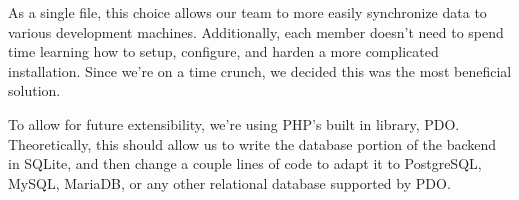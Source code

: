 \documentclass[journal]{IEEEtran}
\begin{document}
As a single file, this choice allows our team to more easily synchronize data to various development machines. Additionally, each member doesn't need to spend time learning how to setup, configure, and harden a more complicated installation. Since we're on a time crunch, we decided this was the most beneficial solution. 

To allow for future extensibility, we're using PHP's built in library, PDO. Theoretically, this should allow us to write the database portion of the backend in SQLite, and then change a couple lines of code to adapt it to PostgreSQL, MySQL, MariaDB, or any other relational database supported by PDO. 








\ifCLASSOPTIONcaptionsoff
  \newpage
\fi





%
%
%
\end{document}
